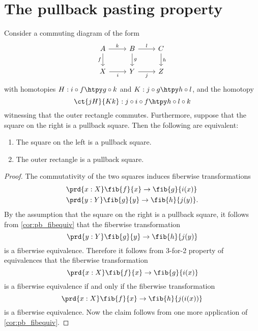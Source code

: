 \section{The pullback pasting property}

\begin{thm}\label{thm:pb_pasting}
Consider a commuting diagram of the form
\begin{equation*}
\begin{tikzcd}
A \arrow[r,"k"] \arrow[d,swap,"f"] & B \arrow[r,"l"] \arrow[d,"g"] & C \arrow[d,"h"] \\
X \arrow[r,swap,"i"] & Y \arrow[r,swap,"j"] & Z
\end{tikzcd}
\end{equation*}
with homotopies $H:i\circ f\htpy g\circ k$ and $K:j\circ g\htpy h\circ l$, and the homotopy
\begin{equation*}
\ct{jH}{Kk}:j\circ i\circ f\htpy h\circ l\circ k
\end{equation*}
witnessing that the outer rectangle commutes. Furthermore, suppose that the square on the right is a pullback square. Then the following are equivalent:
\begin{samepage}%
\begin{enumerate}
\item The square on the left is a pullback square.
\item The outer rectangle is a pullback square.
\end{enumerate}%
\end{samepage}%
\end{thm}

\begin{proof}
The commutativity of the two squares induces fiberwise transformations
\begin{align*}
& \prd{x:X}\fib{f}{x}\to \fib{g}{i(x)} \\
& \prd{y:Y}\fib{g}{y}\to \fib{h}{j(y)}.
\end{align*}
By the assumption that the square on the right is a pullback square, it follows from \cref{cor:pb_fibequiv} that the fiberwise transformation
\begin{equation*}
\prd{y:Y}\fib{g}{y}\to\fib{h}{j(y)}
\end{equation*}
is a fiberwise equivalence. Therefore it follows from 3-for-2 property of equivalences that the fiberwise transformation
\begin{equation*}
\prd{x:X}\fib{f}{x}\to\fib{g}{i(x)}
\end{equation*}
is a fiberwise equivalence if and only if the fiberwise transformation
\begin{equation*}
\prd{x:X}\fib{f}{x}\to\fib{h}{j(i(x))}
\end{equation*}
is a fiberwise equivalence. Now the claim follows from one more application of \cref{cor:pb_fibequiv}.
\end{proof}

